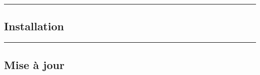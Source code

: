 \documentclass[a4paper,10pt]{article}
\begin{document}
\color{green}\par\noindent\rule{\textwidth}{0.4pt}\color{white}

\color{green}
\subsection{Installation}\color{white}



\color{green}\par\noindent\rule{\textwidth}{0.4pt}\color{white}

\color{green}
\subsection{Mise à jour}\color{white}
\end{document}
